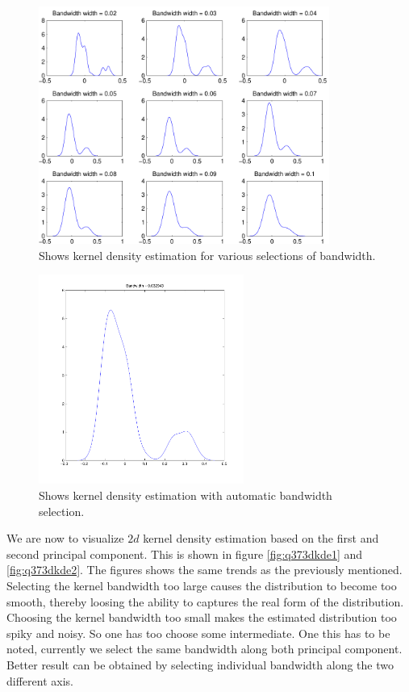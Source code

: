 \begin{figure}[!htbp]
  \centering
  \includegraphics[width=0.85\textwidth]{./images/q37kde}
  \caption{Shows kernel density estimation for various selections of
    bandwidth.}
  \label{fig:q37kde}
\end{figure}

\begin{figure}[!htbp]
  \centering
  \includegraphics[width=0.6\textwidth]{./images/q37kdeauto}
  \caption{Shows kernel density estimation with automatic bandwidth
    selection.}
  \label{fig:q37kdeauto}
\end{figure}

\newpage

We are now to visualize $2d$ kernel density estimation based on the
first and second principal component. This is shown in figure
\ref{fig:q373dkde1} and \ref{fig:q373dkde2}. The figures shows the
same trends as the previously mentioned. Selecting the kernel
bandwidth too large causes the distribution to become too smooth,
thereby loosing the ability to captures the real form of the
distribution. Choosing the kernel bandwidth too small makes the
estimated distribution too spiky and noisy. So one has too choose some
intermediate. One this has to be noted, currently we select the same
bandwidth along both principal component. Better result can be
obtained by selecting individual bandwidth along the two different
axis.

